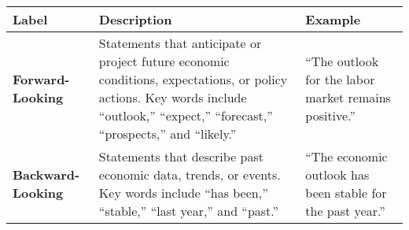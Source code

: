 \begin{table*}
    \caption{}
    \vspace{1em}
    \begin{tabular}{p{}p{}p{}}
    \toprule
    \textbf{Label} & \textbf{Description} & \textbf{Example} \\
    \midrule
    \textbf{Forward-Looking} & Statements that anticipate or project future economic conditions, expectations, or policy actions. Key words include “outlook,” “expect,” “forecast,” “prospects,” and “likely.” & “The outlook for the labor market remains positive.” \\
    \midrule
    \textbf{Backward-Looking} & Statements that describe past economic data, trends, or events. Key words include “has been,” “stable,” “last year,” and “past.” & “The economic outlook has been stable for the past year.” \\
    \bottomrule
    \end{tabular}
    \label{tb:rba_forward_looking_guide}
    \end{table*}